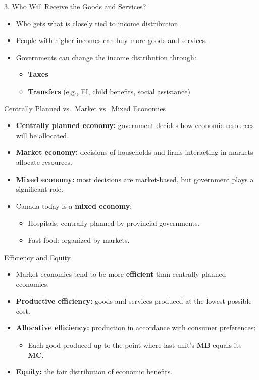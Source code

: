 \documentclass[aspectratio=169]{beamer}
\begin{document}
\begin{frame}{3. Who Will Receive the Goods and Services?}
\transfade
\begin{itemize}
  \item Who gets what is closely tied to \alert{income distribution}.
  \item People with higher incomes can buy more goods and services.
  \item Governments can change the income distribution through:
  \begin{itemize}
    \item \textbf{Taxes}
    \item \textbf{Transfers} (e.g., EI, child benefits, social assistance)
  \end{itemize}
\end{itemize}
\end{frame}

\begin{frame}{Centrally Planned vs.\ Market vs.\ Mixed Economies}
\transfade
\begin{itemize}
  \item \textbf{Centrally planned economy:} government decides how economic resources will be allocated.
  \item \textbf{Market economy:} decisions of households and firms interacting in markets allocate resources.
  \item \textbf{Mixed economy:} most decisions are market-based, but government plays a significant role.
  \item Canada today is a \textbf{mixed economy}:
  \begin{itemize}
    \item Hospitals: centrally planned by provincial governments.
    \item Fast food: organized by markets.
  \end{itemize}
\end{itemize}
\end{frame}

\begin{frame}{Efficiency and Equity}
\transfade
\begin{itemize}
  \item Market economies tend to be more \textbf{efficient} than centrally planned economies.
  \item \textbf{Productive efficiency:} goods and services produced at the lowest possible cost.
  \item \textbf{Allocative efficiency:} production in accordance with consumer preferences:
  \begin{itemize}
    \item Each good produced up to the point where last unit's \textbf{MB} equals its \textbf{MC}.
  \end{itemize}
  \item \textbf{Equity:} the fair distribution of economic benefits.
\end{itemize}
\end{frame}
\end{document}
